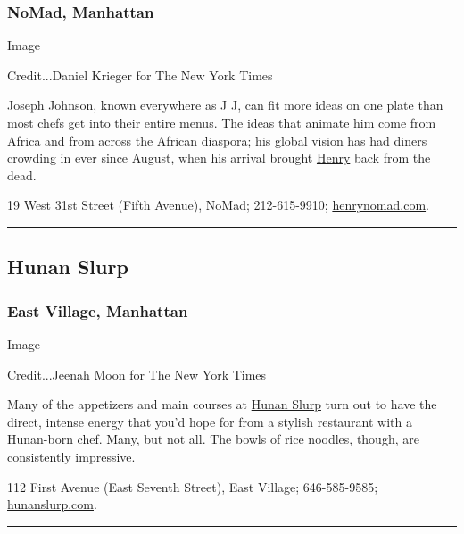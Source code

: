 \hypertarget{nomad-manhattan}{%
\subsubsection{NoMad, Manhattan}\label{nomad-manhattan}}

Image

Credit...Daniel Krieger for The New York Times

Joseph Johnson, known everywhere as J J, can fit more ideas on one plate
than most chefs get into their entire menus. The ideas that animate him
come from Africa and from across the African diaspora; his global vision
has had diners crowding in ever since August, when his arrival brought
\href{https://www.nytimes3xbfgragh.onion/2018/10/30/dining/henry-at-life-hotel-by-jj-review.html}{Henry}
back from the dead.

19 West 31st Street (Fifth Avenue), NoMad; 212-615-9910;
\href{http://henrynomad.com/}{henrynomad.com}.

\begin{center}\rule{0.5\linewidth}{\linethickness}\end{center}

\hypertarget{hunan-slurp}{%
\subsection{Hunan Slurp}\label{hunan-slurp}}

\hypertarget{east-village-manhattan}{%
\subsubsection{East Village, Manhattan}\label{east-village-manhattan}}

Image

Credit...Jeenah Moon for The New York Times

Many of the appetizers and main courses at
\href{https://www.nytimes3xbfgragh.onion/2018/10/23/dining/hunan-slurp-review.html}{Hunan
Slurp} turn out to have the direct, intense energy that you'd hope for
from a stylish restaurant with a Hunan-born chef. Many, but not all. The
bowls of rice noodles, though, are consistently impressive.

112 First Avenue (East Seventh Street), East Village; 646-585-9585;
\href{https://www.hunanslurp.com/}{hunanslurp.com}.

\begin{center}\rule{0.5\linewidth}{\linethickness}\end{center}

